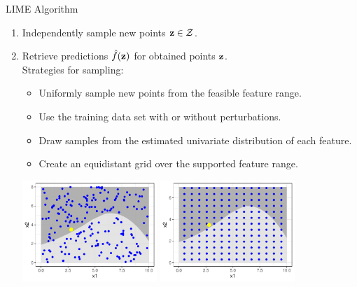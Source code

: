 \documentclass[11pt,compress,t,notes=noshow, aspectratio=169, xcolor=table]{beamer}
\begin{document}
\begin{vbframe}{LIME Algorithm}

		\begin{enumerate}
		\item Independently sample new points $\zv \in \Zspace$. 
		\item Retrieve predictions $\fh(\zv)$ for obtained points $\zv$. \\[0.2cm]
		
		\hspace{-0.7cm} Strategies for sampling: 
		\begin{itemize} 
			\item Uniformly sample new points from the feasible feature range. 
			\item Use the training data set with or without perturbations.
			\item Draw samples from the estimated univariate distribution of each feature.
			\item Create an equidistant grid over the supported feature range.  
		\end{itemize}
		\begin{center}
			\includegraphics[width=0.4\textwidth]{figure/lime3} \hspace{0.1cm}
			\includegraphics[width=0.4\textwidth]{figure/lime3a}
		\end{center}
		

\end{enumerate}
\end{vbframe}
\end{document}
